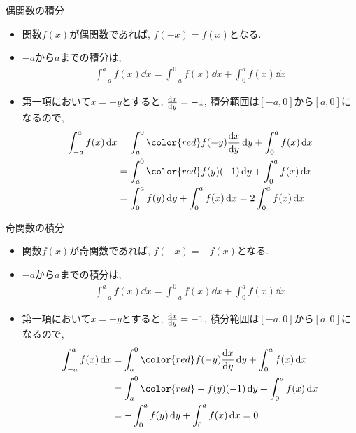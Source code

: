 \documentclass[dvipdfmx,notheorems,t]{beamer}
\begin{document}
\begin{frame}{偶関数の積分}
\begin{itemize}
  \item 関数$f(x)$が偶関数であれば, $f(-x) = f(x)$となる.
  \item $-a$から$a$までの積分は,
  \begin{align*}
    \int_{-a}^a f(x) \dd{x} = \int_{-a}^0 f(x) \dd{x} + \int_0^a f(x) \dd{x}
  \end{align*}
  \item 第一項において$x = -y$とすると, $\dv{x}{y} = -1$, 積分範囲は$[-a, 0]$から$[a, 0]$になるので,
  \begin{align*}
    \int_{-a}^a f(x) \dd{x} &= \int_a^0 {\color{red} f(-y)} \dv{x}{y} \dd{y} + \int_0^a f(x) \dd{x} \\
      &= \int_a^0 {\color{red} f(y)} (-1) \dd{y} + \int_0^a f(x) \dd{x} \\
      &= \int_0^a f(y) \dd{y} + \int_0^a f(x) \dd{x}
      = 2 \int_0^a f(x) \dd{x}
  \end{align*}
\end{itemize}
\end{frame}

\begin{frame}{奇関数の積分}
\begin{itemize}
  \item 関数$f(x)$が奇関数であれば, $f(-x) = -f(x)$となる.
  \item $-a$から$a$までの積分は,
  \begin{align*}
    \int_{-a}^a f(x) \dd{x} = \int_{-a}^0 f(x) \dd{x} + \int_0^a f(x) \dd{x}
  \end{align*}
  \item 第一項において$x = -y$とすると, $\dv{x}{y} = -1$, 積分範囲は$[-a, 0]$から$[a, 0]$になるので,
  \begin{align*}
    \int_{-a}^a f(x) \dd{x} &= \int_a^0 {\color{red} f(-y)} \dv{x}{y} \dd{y} + \int_0^a f(x) \dd{x} \\
      &= \int_a^0 {\color{red} -f(y)} (-1) \dd{y} + \int_0^a f(x) \dd{x} \\
      &= - \int_0^a f(y) \dd{y} + \int_0^a f(x) \dd{x} = 0
  \end{align*}
\end{itemize}
\end{frame}
\end{document}
